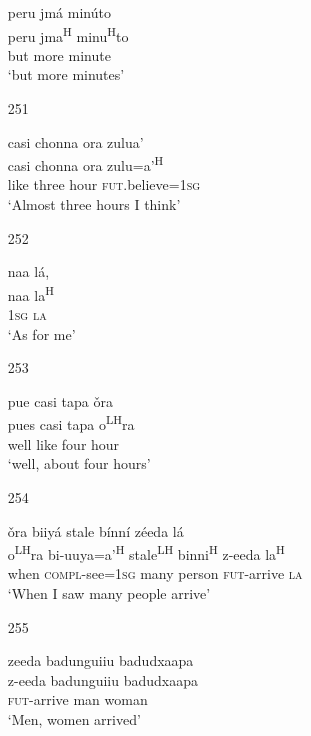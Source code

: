 \begin{itemize}
\glll  peru jm\'{a} min\'{u}to\\
peru jma\textsuperscript{H} minu\textsuperscript{H}to\\
but more minute\\
\glt `but more minutes'
 


\item[251]
 
\glll  casi chonna ora zulua'\\
casi chonna ora zulu=a'\textsuperscript{H}\\
like three hour \textsc{fut}.believe=\textsc{1sg}\\
\glt `Almost three hours I think'
 



\item[252]
 
\glll   naa l\'{a}, \\
 naa la\textsuperscript{H}\\
 \textsc{1sg} \textsc{la}\\
\glt `As for me'
 


\item[253]
 
\glll   pue casi tapa \v{o}ra  \\
pues casi tapa o\textsuperscript{LH}ra\\
 well like four hour\\
\glt `well, about four hours'
 


\item[254]
 
\glll   \v{o}ra biiy\'{a} stale b\'{i}nn\'{i} z\'{e}eda l\'{a}\\
o\textsuperscript{LH}ra bi-uuya=a'\textsuperscript{H} stale\textsuperscript{LH} binni\textsuperscript{H} z-eeda la\textsuperscript{H}\\
when \textsc{compl}-see=\textsc{1sg} many person \textsc{fut}-arrive \textsc{la}\\
\glt `When I saw many people arrive'
 


\item[255]
 
\glll   zeeda badunguiiu badudxaapa\\
z-eeda badunguiiu badudxaapa\\
\textsc{fut}-arrive man woman\\
\glt `Men, women arrived' 
 



\end{itemize}
